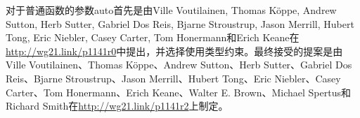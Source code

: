 

对于普通函数的参数auto首先是由Ville Voutilainen, Thomas Köppe, Andrew Sutton, Herb Sutter, Gabriel Dos Reis, Bjarne Stroustrup, Jason Merrill, Hubert Tong, Eric Niebler, Casey Carter, Tom Honermann和Erich Keane在\url{http://wg21.link/p1141r0}中提出，并选择使用类型约束。最终接受的提案是由Ville Voutilainen、Thomas Köppe、Andrew Sutton、Herb Sutter、Gabriel Dos Reis、Bjarne Stroustrup、Jason Merrill、Hubert Tong、Eric Niebler、Casey Carter、Tom Honermann、Erich Keane、Walter E. Brown、Michael Spertus和Richard Smith在\url{http://wg21.link/p1141r2}上制定。